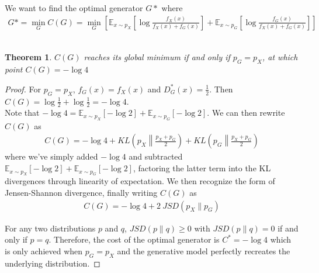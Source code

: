 \documentclass[submission]{eptcs}
\newtheorem{theorem}{Theorem}
\begin{document}
\noindent We want to find the optimal generator $G*$ where
\begin{align}
    G* = \min_G C(G) = \min_G \left [ \mathbb{E}_{x \sim p_X} \left [\log \frac{f_X(x)}{f_X(x) + f_G(x)} \right ] + \mathbb{E}_{x \sim p_G} \left [ \log \frac{f_G(x)}{f_X(x) + f_G(x)} \right ] \right ]
\end{align}
\ \\

\begin{theorem}
    $C(G)$ reaches its global minimum if and only if $p_G = p_X$, at which point $C(G) = - \log 4$
\end{theorem}
\begin{proof}
    For $p_G = p_X$, $f_G(x) = f_X(x)$ and $D^*_G(x) = \frac{1}{2}$. Then $C(G) = \log \frac{1}{2} + \log \frac{1}{2} = - \log 4$. \\

    \noindent Note that $-\log 4 = \mathbb{E}_{x \sim p_X} \left[ - \log 2 \right] + \mathbb{E}_{x \sim p_G} \left[ - \log 2 \right]$. We can then rewrite $C(G)$ as
    \begin{align}
        C(G) = - \log 4 + KL\left(p_X \left \| \frac{p_X + p_G}{2} \right. \right) + KL\left(p_G \left \| \frac{p_X + p_G}{2} \right. \right)
    \end{align}
    where we've simply added $-\log 4$ and subtracted $\mathbb{E}_{x \sim p_X} \left[ - \log 2 \right] + \mathbb{E}_{x \sim p_G} \left[ - \log 2 \right]$, factoring the latter term into the KL divergences through linearity of expectation. We then recognize the form of Jensen-Shannon divergence, finally writing $C(G)$ as
    \begin{align}
        C(G) = -\log 4 + 2 \ JSD(p_X \| p_G)
    \end{align}

    \noindent For any two distributions $p$ and $q$, $JSD(p \| q) \geq 0$ with $JSD(p \| q) = 0$ if and only if $p = q$. Therefore, the cost of the optimal generator is $C^* = -\log 4$ which is only achieved when $p_G = p_X$ and the generative model perfectly recreates the underlying distribution.
\end{proof}
\end{document}
